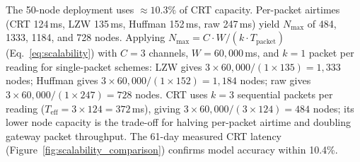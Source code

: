 \documentclass[pdflatex,sn-mathphys-num]{sn-jnl}
\theoremstyle{thmstyleone}
\theoremstyle{thmstyletwo}
\theoremstyle{thmstylethree}
\begin{document}
The 50-node deployment uses $\approx10.3\%$ of CRT capacity. Per-packet airtimes (CRT 124\,ms, LZW 135\,ms, Huffman 152\,ms, raw 247\,ms) yield $N_{\max}$ of 484, 1333, 1184, and 728 nodes. Applying $N_{\max} = C \cdot W / (k \cdot T_{\text{packet}})$ (Eq.~\ref{eq:scalability}) with $C=3$ channels, $W=60{,}000$\,ms, and $k=1$ packet per reading for single-packet schemes: LZW gives $3\times60{,}000/(1\times135)=1{,}333$ nodes; Huffman gives $3\times60{,}000/(1\times152)=1{,}184$ nodes; raw gives $3\times60{,}000/(1\times247)=728$ nodes. CRT uses $k=3$ sequential packets per reading ($T_{\text{eff}}=3\times124=372$\,ms), giving $3\times60{,}000/(3\times124)=484$ nodes; its lower node capacity is the trade-off for halving per-packet airtime and doubling gateway packet throughput. The 61-day measured CRT latency (Figure~\ref{fig:scalability_comparison}) confirms model accuracy within 10.4\%.
\end{document}
